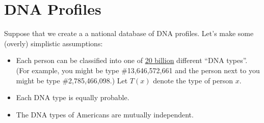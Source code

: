 \documentclass[12pt]{article}
\begin{document}

\section{DNA Profiles}
Suppose that we create a a national database of DNA profiles.  Let's
make some (overly) simplistic assumptions:
%
\begin{itemize}
\item Each person can be classified into one of \underline{20 billion}
different ``DNA types''.  (For example, you might be type
\#13,646,572,661 and the person next to you might be type
\#2,785,466,098.)  Let $T(x)$ denote the type of person $x$.
\item Each DNA type is equally probable.
\item The DNA types of Americans are mutually independent.
\end{itemize}
\end{document}
